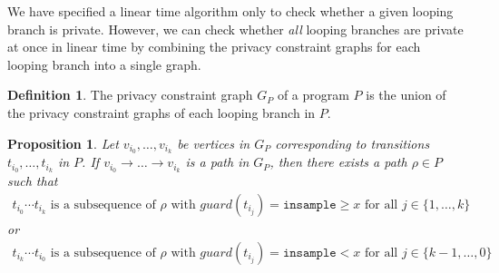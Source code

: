 \documentclass[12pt]{article}
\newcommand{\gguard}[1][x]{\texttt{insample}\geq#1}
\newcommand{\lguard}[1][x]{\texttt{insample} < #1}
\newtheorem{prop}[thm]{Proposition}
\theoremstyle{definition}
\newtheorem{defn}[thm]{Definition}
\begin{document}
We have specified a linear time algorithm only to check whether a given looping branch is private. However, we can check whether \textit{all} looping branches are private at once in linear time by combining the privacy constraint graphs for each looping branch into a single graph.

\begin{defn}
    The privacy constraint graph $G_P$ of a program $P$ is the union of the privacy constraint graphs of each looping branch in $P$.
\end{defn}

\begin{prop}
    \label{prop:paths_in_privacy_graph}
    Let $v_{i_0}, \dots, v_{i_k}$ be vertices in $G_P$ corresponding to transitions $t_{i_0}, \dots, t_{i_k}$ in $P$. If $v_{i_0} \to \dots \to v_{i_k}$ is a path in $G_P$, then there exists a path $\rho \in P$ such that 
    \begin{align*}
        t_{i_0} \cdots t_{i_k} \text{ is a subsequence of } \rho \text{ with } guard(t_{i_j}) = \gguard \text { for all } j \in \{1, \dots, k\}
    \end{align*}
    or
    \begin{align*}
        t_{i_k} \cdots t_{i_0} \text{ is a subsequence of } \rho \text{ with } guard(t_{i_j}) = \lguard \text { for all } j \in \{k - 1, \dots, 0\}
    \end{align*}
\end{prop}
\end{document}

